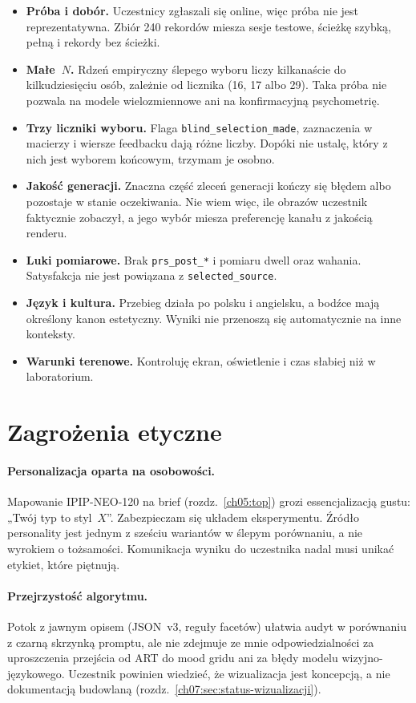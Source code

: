 \begin{itemize}
  \item \textbf{Próba i dobór.} Uczestnicy zgłaszali się online, więc próba nie jest reprezentatywna. Zbiór 240 rekordów miesza sesje testowe, ścieżkę szybką, pełną i rekordy bez ścieżki.
  \item \textbf{Małe~$N$.} Rdzeń empiryczny ślepego wyboru liczy kilkanaście do kilkudziesięciu osób, zależnie od licznika (16, 17 albo 29). Taka próba nie pozwala na modele wielozmiennowe ani na konfirmacyjną psychometrię.
  \item \textbf{Trzy liczniki wyboru.} Flaga \texttt{blind\_selection\_made}, zaznaczenia w macierzy i wiersze feedbacku dają różne liczby. Dopóki nie ustalę, który z nich jest wyborem końcowym, trzymam je osobno.
  \item \textbf{Jakość generacji.} Znaczna część zleceń generacji kończy się błędem albo pozostaje w stanie oczekiwania. Nie wiem więc, ile obrazów uczestnik faktycznie zobaczył, a jego wybór miesza preferencję kanału z jakością renderu.
  \item \textbf{Luki pomiarowe.} Brak \texttt{prs\_post\_*} i pomiaru dwell oraz wahania. Satysfakcja nie jest powiązana z \texttt{selected\_source}.
  \item \textbf{Język i kultura.} Przebieg działa po polsku i angielsku, a bodźce mają określony kanon estetyczny. Wyniki nie przenoszą się automatycznie na inne konteksty.
  \item \textbf{Warunki terenowe.} Kontroluję ekran, oświetlenie i czas słabiej niż w laboratorium.
\end{itemize}

\section{Zagrożenia etyczne}
\label{ch09:sec:etyka}

\paragraph{Personalizacja oparta na osobowości.}
Mapowanie IPIP-NEO-120 na brief (rozdz.~\ref{ch05:top}) grozi essencjalizacją gustu: „Twój typ to styl~$X$”. Zabezpieczam się układem eksperymentu. Źródło personality jest jednym z sześciu wariantów w ślepym porównaniu, a nie wyrokiem o tożsamości. Komunikacja wyniku do uczestnika nadal musi unikać etykiet, które piętnują.

\paragraph{Przejrzystość algorytmu.}
Potok z jawnym opisem (JSON~v3, reguły facetów) ułatwia audyt w porównaniu z czarną skrzynką promptu, ale nie zdejmuje ze mnie odpowiedzialności za uproszczenia przejścia od ART do mood gridu ani za błędy modelu wizyjno-językowego. Uczestnik powinien wiedzieć, że wizualizacja jest koncepcją, a nie dokumentacją budowlaną (rozdz.~\ref{ch07:sec:status-wizualizacji}).

